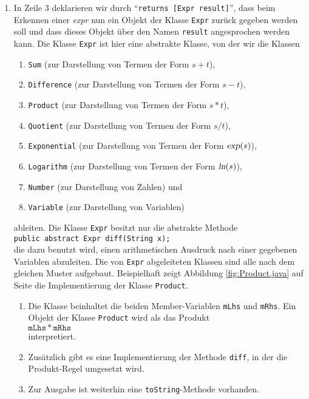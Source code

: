 \begin{enumerate}
\item In Zeile 3 deklarieren wir durch ``\texttt{returns [Expr result]}'',
      dass beim Erkennen einer \textsl{expr} nun ein Objekt der Klasse \texttt{Expr}
      zur\"uck gegeben werden soll und dass dieses Objekt \"uber den Namen
      \texttt{result} angesprochen werden kann.  Die Klasse \texttt{Expr} ist hier eine abstrakte
      Klasse, von der wir die Klassen
      \begin{enumerate}
      \item \texttt{Sum} (zur Darstellung von Termen der Form $s + t$),
      \item \texttt{Difference} (zur Darstellung von Termen der Form $s - t$),
      \item \texttt{Product} (zur Darstellung von Termen der Form $s * t$),
      \item \texttt{Quotient} (zur Darstellung von Termen der Form $s / t$),
      \item \texttt{Exponential} (zur Darstellung von Termen der Form $\textsl{exp}(s)$),
      \item \texttt{Logarithm} (zur Darstellung von Termen der Form $\textsl{ln}(s)$),
      \item \texttt{Number} (zur Darstellung von Zahlen) und
      \item \texttt{Variable} (zur Darstellung von Variablen)
      \end{enumerate}
      ableiten.  Die Klasse \texttt{Expr} besitzt nur die abstrakte Methode 
      \\[0.2cm]
      \hspace*{1.3cm}
      \texttt{public abstract Expr diff(String x);}
      \\[0.2cm]
      die dazu benutzt wird, einen arithmetischen Ausdruck nach einer gegebenen Variablen
      abzuleiten.  Die von \texttt{Expr} abgeleiteten Klassen sind alle nach dem gleichen Muster
      aufgebaut.  Beispielhaft zeigt Abbildung \ref{fig:Product.java} auf Seite \pageref{fig:Product.java}
        die Implementierung der Klasse 
      \texttt{Product}.
      \begin{enumerate}
      \item Die Klasse beinhaltet die beiden Member-Variablen \texttt{mLhs} und \texttt{mRhs}.
            Ein Objekt der Klasse \texttt{Product} wird als das Produkt
            \\[0.2cm]
            \hspace*{1.3cm}
            $\mathtt{mLhs} * \mathtt{mRhs}$
            \\[0.2cm]
            interpretiert.
      \item Zus\"atzlich gibt es eine Implementierung der Methode \texttt{diff}, in der die
            Produkt-Regel umgesetzt wird.
      \item Zur Ausgabe ist weiterhin eine \texttt{toString}-Methode vorhanden.
      \end{enumerate}


\end{enumerate}
